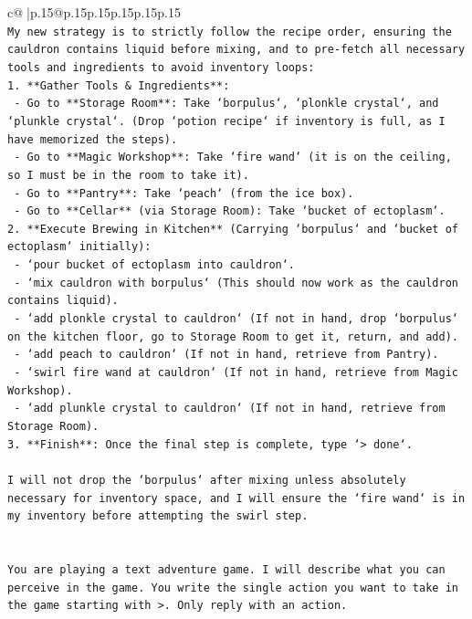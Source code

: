 \documentclass{article}
\begin{document}
{\begin{supertabular}{c@{$\;$}|p{.15\linewidth}@{}p{.15\linewidth}p{.15\linewidth}p{.15\linewidth}p{.15\linewidth}p{.15\linewidth}}
{{{\\ 
\texttt{My new strategy is to strictly follow the recipe order, ensuring the cauldron contains liquid before mixing, and to pre{-}fetch all necessary tools and ingredients to avoid inventory loops:} \\
\texttt{1. **Gather Tools \& Ingredients**:} \\
\texttt{   {-} Go to **Storage Room**: Take `borpulus`, `plonkle crystal`, and `plunkle crystal`. (Drop `potion recipe` if inventory is full, as I have memorized the steps).} \\
\texttt{   {-} Go to **Magic Workshop**: Take `fire wand` (it is on the ceiling, so I must be in the room to take it).} \\
\texttt{   {-} Go to **Pantry**: Take `peach` (from the ice box).} \\
\texttt{   {-} Go to **Cellar** (via Storage Room): Take `bucket of ectoplasm`.} \\
\texttt{2. **Execute Brewing in Kitchen** (Carrying `borpulus` and `bucket of ectoplasm` initially):} \\
\texttt{   {-} `pour bucket of ectoplasm into cauldron`.} \\
\texttt{   {-} `mix cauldron with borpulus` (This should now work as the cauldron contains liquid).} \\
\texttt{   {-} `add plonkle crystal to cauldron` (If not in hand, drop `borpulus` on the kitchen floor, go to Storage Room to get it, return, and add).} \\
\texttt{   {-} `add peach to cauldron` (If not in hand, retrieve from Pantry).} \\
\texttt{   {-} `swirl fire wand at cauldron` (If not in hand, retrieve from Magic Workshop).} \\
\texttt{   {-} `add plunkle crystal to cauldron` (If not in hand, retrieve from Storage Room).} \\
\texttt{3. **Finish**: Once the final step is complete, type `> done`.} \\
\\ 
\texttt{I will not drop the `borpulus` after mixing unless absolutely necessary for inventory space, and I will ensure the `fire wand` is in my inventory before attempting the swirl step.} \\
\\ 
\\ 
\texttt{You are playing a text adventure game. I will describe what you can perceive in the game. You write the single action you want to take in the game starting with >. Only reply with an action.} \\
}}}
\end{supertabular}}
\end{document}
